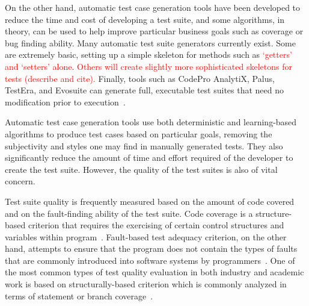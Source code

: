 On the other hand, automatic test case generation tools have been developed to reduce the time and cost of developing a test suite, and some algorithms, in theory, can be used to help improve particular business goals such as coverage or bug finding ability.  Many automatic test suite generators currently exist.  Some are extremely basic, setting up a simple skeleton for methods such as \textcolor{red}{`getters' and `setters' alone}\cite{}.  \textcolor{red}{Others will create slightly more sophisticated skeletons for tests (describe and cite).}  Finally, tools such as CodePro AnalytiX, Palus, TestEra, and Evosuite can generate full, executable test suites that need no modification prior to execution~\cite{Fraser:2011:EAT:2025113.2025179, Zhang:2011:PHA:1985793.1986036, Marinov:2001:TNF:872023.872551, codepro}.  

Automatic test case generation tools use both deterministic and learning-based algorithms to produce test cases based on particular goals, removing the subjectivity and styles one may find in manually generated tests.  They also significantly reduce the amount of time and effort required of the developer to create the test suite.  However, the quality of the test suites is also of vital concern.  

Test suite quality is frequently measured based on the amount of code covered and on the fault-finding ability of the test suite.  Code coverage is a structure-based criterion that requires the exercising of certain control structures and variables within program~\cite{kapfhammer-testing-handbook}. Fault-based test adequacy criterion, on the other hand, attempts to ensure that the program does not contain the types of faults that are commonly introduced into software systems by programmers~\cite{demillo1978hints, zhu1997software}.  One of the most common types of test quality evaluation in both industry and academic work is based on structurally-based criterion which is commonly analyzed in terms of statement or branch coverage~\cite{weyuker1988evaluation}.

